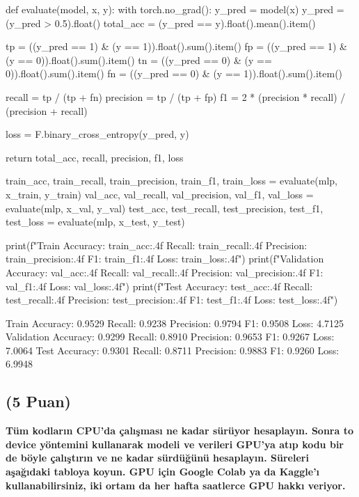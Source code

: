 \documentclass[11pt]{article}
\begin{document}
\begin{python}
def evaluate(model, x, y):
    with torch.no_grad():
        y_pred = model(x)
        y_pred = (y_pred > 0.5).float()
        total_acc = (y_pred == y).float().mean().item()
        
        tp = ((y_pred == 1) & (y == 1)).float().sum().item()
        fp = ((y_pred == 1) & (y == 0)).float().sum().item()
        tn = ((y_pred == 0) & (y == 0)).float().sum().item()
        fn = ((y_pred == 0) & (y == 1)).float().sum().item()
        
        recall = tp / (tp + fn)
        precision = tp / (tp + fp)
        f1 = 2 * (precision * recall) / (precision + recall)
        
        loss = F.binary_cross_entropy(y_pred, y)
        
        return total_acc, recall, precision, f1, loss

train_acc, train_recall, train_precision, train_f1, train_loss = evaluate(mlp, x_train, y_train)
val_acc, val_recall, val_precision, val_f1, val_loss = evaluate(mlp, x_val, y_val)
test_acc, test_recall, test_precision, test_f1, test_loss = evaluate(mlp, x_test, y_test)

print(f"Train Accuracy: {train_acc:.4f} Recall: {train_recall:.4f} Precision: {train_precision:.4f} F1: {train_f1:.4f} Loss: {train_loss:.4f}")
print(f"Validation Accuracy: {val_acc:.4f} Recall: {val_recall:.4f} Precision: {val_precision:.4f} F1: {val_f1:.4f} Loss: {val_loss:.4f}")
print(f"Test Accuracy: {test_acc:.4f} Recall: {test_recall:.4f} Precision: {test_precision:.4f} F1: {test_f1:.4f} Loss: {test_loss:.4f}")
\end{python}

Train Accuracy: 0.9529 Recall: 0.9238 Precision: 0.9794 F1: 0.9508 Loss: 4.7125
Validation Accuracy: 0.9299 Recall: 0.8910 Precision: 0.9653 F1: 0.9267 Loss: 7.0064
Test Accuracy: 0.9301 Recall: 0.8711 Precision: 0.9883 F1: 0.9260 Loss: 6.9948

\subsection{(5 Puan)} \textbf{Tüm kodların CPU'da çalışması ne kadar sürüyor hesaplayın. Sonra to device yöntemini kullanarak modeli ve verileri GPU'ya atıp kodu bir de böyle çalıştırın ve ne kadar sürdüğünü hesaplayın. Süreleri aşağıdaki tabloya koyun. GPU için Google Colab ya da Kaggle'ı kullanabilirsiniz, iki ortam da her hafta saatlerce GPU hakkı veriyor.}
\end{document}
